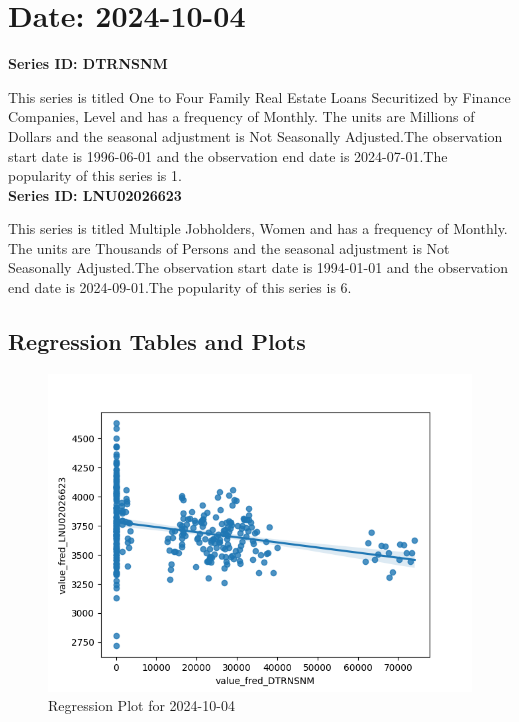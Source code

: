\section{Date: 2024-10-04}
\noindent \textbf{Series ID: DTRNSNM} 

\noindent This series is titled One to Four Family Real Estate Loans Securitized by Finance Companies, Level and has a frequency of Monthly. The units are Millions of Dollars and the seasonal adjustment is Not Seasonally Adjusted.The observation start date is 1996-06-01 and the observation end date is 2024-07-01.The popularity of this series is 1. \\ 

\noindent \textbf{Series ID: LNU02026623} 

\noindent This series is titled Multiple Jobholders, Women and has a frequency of Monthly. The units are Thousands of Persons and the seasonal adjustment is Not Seasonally Adjusted.The observation start date is 1994-01-01 and the observation end date is 2024-09-01.The popularity of this series is 6. \\ 

\subsection{Regression Tables and Plots}


\begin{figure}
\centering
\includegraphics[scale = 0.9]{plots/plot_2024-10-04.png}
\caption{Regression Plot for 2024-10-04}
\end{figure}
\newpage
